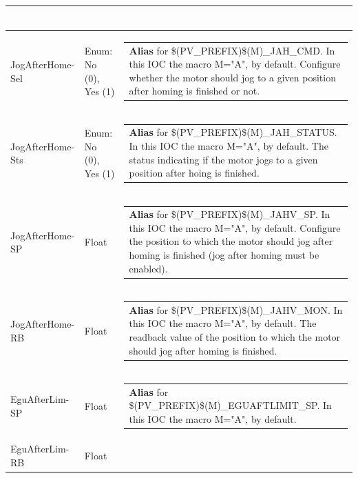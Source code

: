 \documentclass[openany]{article}
\begin{document}
\begin{longtable}{| m{4.5cm} m{2.5cm}  m{8.5cm} |}
\begin{tabular}{@{}m{6cm}@{}}
            \end{tabular} \hypertarget{pv:jog-after-home-sel}{}\\ \hline
        JogAfterHome-Sel & Enum: No (0), Yes (1) & \begin{tabular}{@{}m{6cm}@{}}
                \textbf{\color{blue} Alias} for \$(PV\_PREFIX)\$(M)\_JAH\_CMD. In this IOC the macro M="A", by default. Configure whether the motor should jog to a given position after homing is finished or not.
            \end{tabular} \hypertarget{}{}\\ \hline
        JogAfterHome-Sts & Enum: No (0), Yes (1) & \begin{tabular}{@{}m{6cm}@{}}
                \textbf{\color{blue} Alias} for \$(PV\_PREFIX)\$(M)\_JAH\_STATUS. In this IOC the macro M="A", by default. The status indicating if the motor jogs to a given position after hoing is finished.
            \end{tabular} \hypertarget{pv:jog-after-home-sp}{}\\ \hline
        JogAfterHome-SP & Float & \begin{tabular}{@{}m{6cm}@{}}
                \textbf{\color{blue} Alias} for \$(PV\_PREFIX)\$(M)\_JAHV\_SP. In this IOC the macro M="A", by default. Configure the position to which the motor should jog after homing is finished (jog after homing must be enabled).
            \end{tabular} \hypertarget{}{}\\ \hline
        JogAfterHome-RB & Float & \begin{tabular}{@{}m{6cm}@{}}
                \textbf{\color{blue} Alias} for \$(PV\_PREFIX)\$(M)\_JAHV\_MON. In this IOC the macro M="A", by default. The readback value of the position to which the motor should jog after homing is finished.
            \end{tabular} \hypertarget{pv:egu-after-lim}{}\\ \hline
        EguAfterLim-SP & Float & \begin{tabular}{@{}m{6cm}@{}}
                \textbf{\color{blue} Alias} for \$(PV\_PREFIX)\$(M)\_EGUAFTLIMIT\_SP. In this IOC the macro M="A", by default.
            \end{tabular} \hypertarget{}{}\\ \hline
        EguAfterLim-RB & Float & \begin{tabular}{@{}m{6cm}@{}}

\end{tabular}
\end{longtable}
\end{document}
